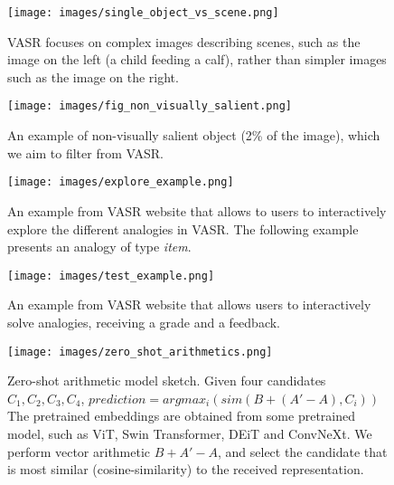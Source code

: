 \documentclass[letterpaper]{article} \usepackage{aaai23}  \usepackage{times}  \usepackage{helvet}  \usepackage{courier}  \usepackage[hyphens]{url}  \usepackage{graphicx} \urlstyle{rm} \def\UrlFont{\rm}  \usepackage{natbib}  \usepackage{caption} \frenchspacing  \setlength{\pdfpagewidth}{8.5in}  \setlength{\pdfpageheight}{11in}  \usepackage{algorithm}
\begin{document}
\begin{figure}[!h]
\centering
\newcommand{\figlen}[0]{\columnwidth}
    \texttt{[image: images/single\_object\_vs\_scene.png]}\\
    \caption{VASR focuses on complex images describing scenes, such as the image on the left (a child feeding a calf), rather than simpler images such as the image on the right.}
    \label{fig:single_object_vs_scene}
\end{figure}

\begin{figure}[!tb]
\centering
    \texttt{[image: images/fig\_non\_visually\_salient.png]}\\
    \caption{An example of non-visually salient object (2\% of the image), which we aim to filter from VASR.}
    \label{fig:fig_non_visually_salient}
\end{figure}

\begin{figure}[!h]
\centering
\newcommand{\figlen}[0]{\columnwidth}
    \texttt{[image: images/explore\_example.png]}\\
    \caption{An example from VASR website that allows to users to interactively explore the different analogies in VASR. The following example presents an analogy of type \emph{item}.}
    \label{fig:explore_example}
\end{figure}

\begin{figure}[!h]
\centering
\newcommand{\figlen}[0]{\columnwidth}
    \texttt{[image: images/test\_example.png]}\\
    \caption{An example from VASR website that allows users to interactively solve analogies, receiving a grade and a feedback.}
    \label{fig:explore_test}
\end{figure}

\begin{figure}[!h]
\centering
\newcommand{\figlen}[0]{\columnwidth}
    \texttt{[image: images/zero\_shot\_arithmetics.png]}\\
    \caption{Zero-shot arithmetic model sketch. Given four candidates $C_1, C_2, C_3, C_4$, \newline$prediction = argmax_{i}(sim(B+(A'-A),C_i))$\newline The pretrained embeddings are obtained from some pretrained model, such as ViT, Swin Transformer, DEiT and ConvNeXt. We perform vector arithmetic $B + A' - A$, and select the candidate that is most similar (cosine-similarity) to the received representation.}
    \label{fig:zero_shot_arithmetics}
\end{figure}
\end{document}
